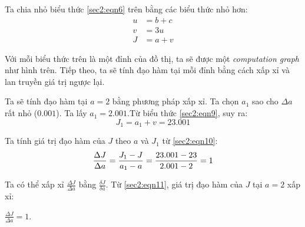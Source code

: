 Ta chia nhỏ biểu thức \ref{sec2:eqn6} trên bằng các biểu thức nhỏ hơn:
\begin{align}
\label{sec2:eqn7}
u &= b + c\\
\label{sec2:eqn8}
v &= 3u\\
\label{sec2:eqn9}
J &= a + v 
\end{align}

Với mỗi biểu thức trên là một đỉnh của đồ thị, ta sẽ được một \textit{computation graph} như hình trên. Tiếp theo, ta sẽ tính đạo hàm tại mỗi đỉnh bằng cách xấp xỉ và lan truyền giá trị ngược lại.

Ta sẽ tính đạo hàm tại $a=2$ bằng phương pháp xấp xỉ. Ta chọn $a_{1}$ sao cho $\Delta a$ rất nhỏ ($0.001$). Ta lấy $a_{1} = 2.001$.Từ biểu thức \ref{sec2:eqn9}, suy ra:
\begin{equation}
\label{sec2:eqn10}
J_{1} = a_{1} + v = 23.001
\end{equation}

Ta tính giá trị đạo hàm của $J$ theo $a$ và $J_{1}$ từ \ref{sec2:eqn10}:
\begin{equation}
\label{sec2:eqn11}
\frac{\Delta J}{\Delta a} = \frac{J_{1} - J}{a_{1} - a} = \frac{23.001-23}{2.001-2} = 1\\
\end{equation}

Ta có thể xấp xỉ $\frac{\Delta J}{\Delta a}$ bằng $\frac{\delta J}{\delta a}$. Từ \ref{sec2:eqn11}, giá trị đạo hàm của $J$ tại $a=2$ xấp xỉ:
\begin{center}
$\frac{\Delta J}{\Delta a} = 1$.\\
\end{center}

